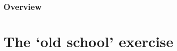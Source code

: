 \documentclass[8pt]{beamer}
\begin{document}
\begin{frame}
\frametitle{Overview}
\tableofcontents[hideallsubsections]
\end{frame}




\section{The `old school' exercise}


\bgroup
{}
\begin{frame}[plain]{}
\begin{center}
\color{white}{\Huge\insertsection}
\end{center}
\end{frame}
\egroup

\end{document}
